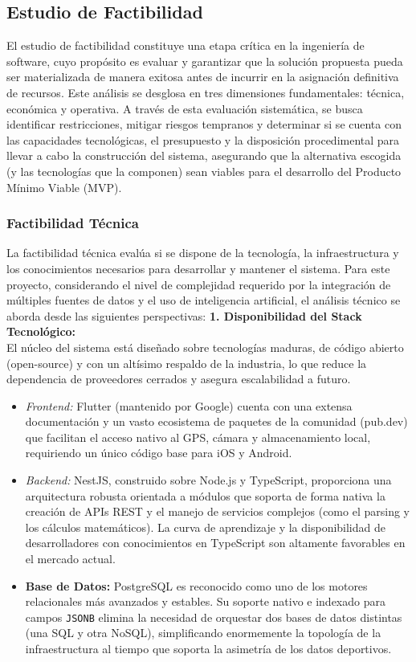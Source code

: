 \documentclass[12pt]{article}
\begin{document}
\subsection{Estudio de Factibilidad}
El estudio de factibilidad constituye una etapa crítica en la ingeniería de software, cuyo propósito es evaluar y garantizar que la solución propuesta pueda ser materializada de manera exitosa antes de incurrir en la asignación definitiva de recursos. Este análisis se desglosa en tres dimensiones fundamentales: técnica, económica y operativa. A través de esta evaluación sistemática, se busca identificar restricciones, mitigar riesgos tempranos y determinar si se cuenta con las capacidades tecnológicas, el presupuesto y la disposición procedimental para llevar a cabo la construcción del sistema, asegurando que la alternativa escogida (y las tecnologías que la componen) sean viables para el desarrollo del Producto Mínimo Viable (MVP).

\subsubsection{Factibilidad Técnica}
La factibilidad técnica evalúa si se dispone de la tecnología, la infraestructura y los conocimientos necesarios para desarrollar y mantener el sistema. Para este proyecto, considerando el nivel de complejidad requerido por la integración de múltiples fuentes de datos y el uso de inteligencia artificial, el análisis técnico se aborda desde las siguientes perspectivas:
\newpage
\textbf{1. Disponibilidad del Stack Tecnológico:}\\
El núcleo del sistema está diseñado sobre tecnologías maduras, de código abierto (open-source) y con un altísimo respaldo de la industria, lo que reduce la dependencia de proveedores cerrados y asegura escalabilidad a futuro.
\begin{itemize}
    \item \textit{Frontend:} Flutter (mantenido por Google) cuenta con una extensa documentación y un vasto ecosistema de paquetes de la comunidad (pub.dev) que facilitan el acceso nativo al GPS, cámara y almacenamiento local, requiriendo un único código base para iOS y Android.
    \item \textit{Backend:} NestJS, construido sobre Node.js y TypeScript, proporciona una arquitectura robusta orientada a módulos que soporta de forma nativa la creación de APIs REST y el manejo de servicios complejos (como el parsing y los cálculos matemáticos). La curva de aprendizaje y la disponibilidad de desarrolladores con conocimientos en TypeScript son altamente favorables en el mercado actual.
    \item \textbf{Base de Datos:} PostgreSQL es reconocido como uno de los motores relacionales más avanzados y estables. Su soporte nativo e indexado para campos \texttt{JSONB} elimina la necesidad de orquestar dos bases de datos distintas (una SQL y otra NoSQL), simplificando enormemente la topología de la infraestructura al tiempo que soporta la asimetría de los datos deportivos.
\end{itemize}
\end{document}
